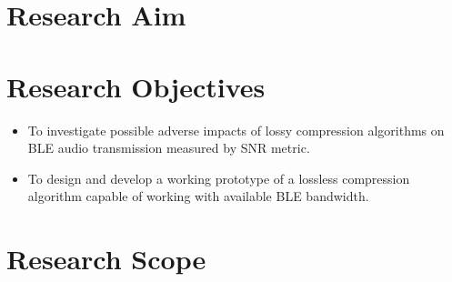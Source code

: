 \documentclass[12pt, twoside]{report}
\begin{document}
\section{Research Aim}
\lipsum[1-1]


\section{Research Objectives}

\begin{itemize}
  \item To investigate possible adverse impacts of lossy compression algorithms on BLE audio transmission measured by SNR metric.
  \item To design and develop a working prototype of a lossless compression algorithm capable of working with available  BLE bandwidth. 
\end{itemize}

\section{Research Scope}


\lipsum[1-1]
\end{document}
